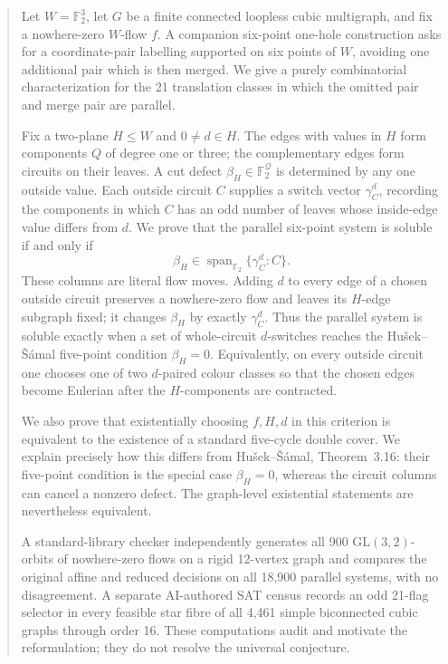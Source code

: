 \documentclass[11pt]{article}
\theoremstyle{definition}
\theoremstyle{remark}
\newcommand{\F}{\mathbb F}
\newcommand{\Q}{\mathcal Q}
\newcommand{\Span}{\operatorname{span}}
\numberwithin{equation}{section}
\begin{document}
\begin{abstract}
Let \(W=\F_2^3\), let \(G\) be a finite connected loopless cubic
multigraph, and fix a nowhere-zero \(W\)-flow \(f\).  A companion
six-point one-hole construction asks for a coordinate-pair labelling
supported on six points of \(W\), avoiding one additional pair which is
then merged.  We give a purely combinatorial characterization for the
21 translation classes in which the omitted pair and merge pair are
parallel.

Fix a two-plane \(H\le W\) and \(0\ne d\in H\).  The edges with values in
\(H\) form components \(Q\) of degree one or three; the complementary
edges form circuits on their leaves.  A cut defect
\(\beta_H\in\F_2^{\Q}\) is determined by any one outside value.  Each
outside circuit \(C\) supplies a switch vector
\(\gamma_C^d\), recording the components in which \(C\) has an odd
number of leaves whose inside-edge value differs from \(d\).  We prove
that the parallel six-point system is soluble if and only if
\[
                  \beta_H\in\Span_{\F_2}\{\gamma_C^d:C\}.
\]
These columns are literal flow moves.  Adding \(d\) to every edge of a
chosen outside circuit preserves a nowhere-zero flow and leaves its
\(H\)-edge subgraph fixed; it changes \(\beta_H\) by exactly
\(\gamma_C^d\).  Thus the parallel system is soluble exactly when a set
of whole-circuit \(d\)-switches reaches the Hu\v{s}ek--\v{S}\'amal
five-point condition \(\beta_H=0\).  Equivalently, on every outside
circuit one chooses one of two \(d\)-paired colour classes so that the
chosen edges become Eulerian after the \(H\)-components are contracted.

We also prove that existentially choosing \(f,H,d\) in this criterion is
equivalent to the existence of a standard five-cycle double cover.  We
explain precisely how this differs from Hu\v{s}ek--\v{S}\'amal,
Theorem~3.16: their five-point condition is the special case
\(\beta_H=0\), whereas the circuit columns can cancel a nonzero defect.
The graph-level existential statements are nevertheless equivalent.

A standard-library checker independently generates all 900
\(\mathrm{GL}(3,2)\)-orbits of nowhere-zero flows on a rigid
12-vertex graph and compares the original affine and reduced decisions
on all 18,900 parallel systems, with no disagreement.  A separate
AI-authored SAT census records an odd 21-flag selector in every feasible
star fibre of all 4,461 simple biconnected cubic graphs through order 16.
These computations audit and motivate the reformulation; they do not
resolve the universal conjecture.
\end{abstract}
\end{document}
